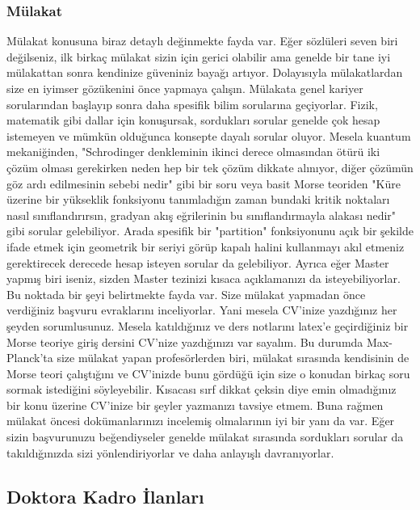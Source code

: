 \documentclass[12pt]{article}
\theoremstyle{break}
\begin{document}
\subsubsection{Mülakat}

Mülakat konusuna biraz detaylı değinmekte fayda var. Eğer sözlüleri seven biri değilseniz, ilk birkaç mülakat sizin için gerici olabilir ama genelde bir tane iyi mülakattan sonra kendinize güveniniz bayağı artıyor. Dolayısıyla mülakatlardan size en iyimser gözükenini önce yapmaya çalışın. Mülakata genel kariyer sorularından başlayıp sonra daha spesifik bilim sorularına geçiyorlar. Fizik, matematik gibi dallar için konuşursak, sordukları sorular genelde çok hesap istemeyen ve mümkün olduğunca konsepte dayalı sorular oluyor. Mesela kuantum mekaniğinden, "Schrodinger denkleminin ikinci derece olmasından ötürü iki çözüm olması gerekirken neden hep bir tek çözüm dikkate alınıyor, diğer çözümün göz ardı edilmesinin sebebi nedir" gibi bir soru veya basit Morse teoriden "Küre üzerine bir yükseklik fonksiyonu tanımladığın zaman bundaki kritik noktaları nasıl sınıflandırırsın, gradyan akış eğrilerinin bu sınıflandırmayla alakası nedir" gibi sorular gelebiliyor. Arada spesifik bir "partition" fonksiyonunu açık bir şekilde ifade etmek için geometrik bir seriyi görüp kapalı halini kullanmayı akıl etmeniz gerektirecek derecede hesap isteyen sorular da gelebiliyor. Ayrıca eğer Master yapmış biri iseniz, sizden Master tezinizi kısaca açıklamanızı da isteyebiliyorlar. Bu noktada bir şeyi belirtmekte fayda var. Size mülakat yapmadan önce verdiğiniz başvuru evraklarını inceliyorlar. Yani mesela CV'inize yazdığınız her şeyden sorumlusunuz. Mesela katıldığınız ve ders notlarını latex'e geçirdiğiniz bir Morse teoriye giriş dersini CV'nize yazdığınızı var sayalım. Bu durumda Max-Planck'ta size mülakat yapan profesörlerden biri, mülakat sırasında kendisinin de Morse teori çalıştığını ve CV'inizde bunu gördüğü için size o konudan birkaç soru sormak istediğini söyleyebilir. Kısacası sırf dikkat çeksin diye emin olmadığınız bir konu üzerine CV'inize bir şeyler yazmanızı tavsiye etmem. Buna rağmen mülakat öncesi dokümanlarınızı incelemiş olmalarının iyi bir yanı da var. Eğer sizin başvurunuzu beğendiyseler genelde mülakat sırasında sordukları sorular da takıldığınızda sizi yönlendiriyorlar ve daha anlayışlı davranıyorlar.

\subsection{Doktora Kadro İlanları}
\end{document}
